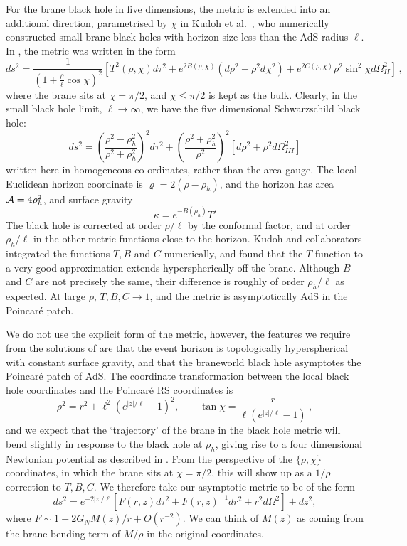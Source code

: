 \documentclass[aps,12pt,prd,superscriptaddress,preprintnumbers, 
	amssymb,
	amsmath,
	notitlepage,
	longbibliography,
	nofootinbib]{revtex4-1}
\newcommand{\be}{\begin{equation}}
\newcommand{\ee}{\end{equation}}
\begin{document}
For the brane black hole in five dimensions, the metric is extended
into an additional direction, parametrised by $\chi$ in Kudoh et al.\
\cite{Kudoh:2003xz}, who numerically constructed small brane black
holes with horizon size less than the AdS radius $\ell$. In
\cite{Kudoh:2003xz}, the metric was written in the form
\be
ds^2 = \frac{1}{(1+\frac{\rho}{\ell}\cos\chi)^2} \left [ T^2(\rho,\chi) d\tau^2 
+ e^{2B(\rho,\chi)} (d\rho^2+\rho^2d\chi^2)
+ e^{2C(\rho,\chi)} \rho^2 \sin^2\!\chi d\Omega_{I\!I}^2 \right]\,,
\label{fivemetric}
\ee
where the brane sits at $\chi=\pi/2$, and $\chi\leq\pi/2$ is kept as the bulk.
Clearly, in the small black hole limit, $\ell \to \infty$, we have the five 
dimensional Schwarzschild black hole:
\be
ds^2 = \left (\frac{\rho^2-\rho_h^2}{\rho^2+\rho_h^2} \right)^2 d\tau^2
+ \left (\frac{\rho^2+\rho_h^2}{\rho^2} \right)^2 \left [
d\rho^2 + \rho^2 d\Omega_{I\!I\!I}^2 \right]
\ee
written here in homogeneous co-ordinates, rather than the area
gauge. The local Euclidean horizon coordinate is 
${\varrho}=2(\rho-\rho_h)$, and the horizon has area
${\cal A} = 4\rho_h^2$, and surface gravity
\be
\kappa = e^{-B(\rho_h)} T'
\label{Kudohkappa}
\ee
The black hole is corrected at order $\rho/\ell$ by the conformal factor, 
and at order $\rho_h/\ell$ in the other metric functions close to the horizon. 
Kudoh and collaborators integrated the functions $T, B$ and $C$ 
numerically, and found that the $T$ function to a very good approximation
extends hyperspherically off the brane. Although $B$ and $C$ are not
precisely the same, their difference is roughly of order $\rho_h/\ell$
as expected. At large $\rho$, $T,B,C\to1$, and 
the metric is asymptotically AdS in the Poincar\'e patch.

We do not use the explicit form of the metric, however, the features
we require from the solutions of \cite{Kudoh:2003xz} are that the
event horizon is topologically hyperspherical with
constant surface gravity, and that the
braneworld black hole asymptotes the Poincar\'e patch of AdS.
The coordinate transformation between the local black hole 
coordinates and the Poincar\'e RS coordinates is
\be
\rho^2 = r^2 + \ell^2 (e^{|z|/\ell}-1)^2,\qquad
\tan\chi = \frac{r}{\ell(e^{|z|/\ell}-1)}\,,
\ee
and we expect that the `trajectory' of the brane in the
black hole metric will bend slightly in response to the black
hole at $\rho_h$, giving rise to a four dimensional Newtonian
potential as described in \cite{Garriga:1999yh}. From the
perspective of the $\{\rho,\chi\}$ coordinates, in which the 
brane sits at $\chi=\pi/2$, this will show up as a $1/\rho$ correction
to $T,B,C$. We therefore take our asymptotic metric to be of the form
\be
ds^2 =e^{-2|z|/\ell}\left [ F(r,z)d\tau^2
+ F(r,z)^{-1}dr^2+r^2d\Omega^2\right]+dz^2,
\label{asympmetric}
\ee
where $F\sim1-2G_NM(z)/r+O(r^{-2})$. We can think of $M(z)$ as
coming from the brane bending term of $M/\rho$ in the original coordinates.
\end{document}
